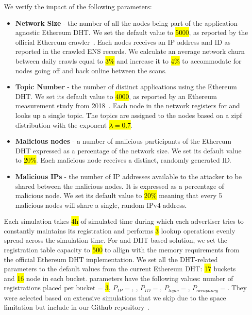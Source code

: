 We verify the impact of the following parameters:
 \begin{itemize}
     \item \textbf{Network Size} - the number of all the nodes being part of the application-agnostic Ethereum DHT. We set the default value to \hl{5000}, as reported by the official Ethereum crawler~\cite{discv4-dns-lists}. Each nodes receives an IP address and ID as reported in the crawled ENS records. We calculate an average network churn between daily crawls equal to \hl{3\%} and increase it to \hl{4\%} to accommodate for nodes going off and back online between the scans. 
     \item \textbf{Topic Number} - the number of distinct applications using the Ethereum DHT. We set its default value to \hl{4000}, as reported by an Ethereum measurement study from 2018~\cite{kim2018measuring}. Each node in the network registers for and looks up a single topic. The topics are assigned to the nodes based on a zipf distribution with the exponent \hl{$\lambda = 0.7$}.
     \item \textbf{Malicious nodes} - a number of malicious participants of the Ethereum DHT expressed as a percentage of the network size. We set its default value to \hl{20\%}. Each malicious node receives a distinct, randomly generated ID. 
     \item \textbf{Malicious IPs} - the number of IP addresses available to the attacker to be shared between the malicious nodes. It is expressed as a percentage of malicious node. We set its default value to \hl{20\%} meaning that every 5 malicious nodes will share a single, random IPv4 address.
 \end{itemize}

Each simulation takes \hl{4h} of simulated time during which each advertiser tries to constantly maintains its registration and performs \hl{3} lookup operations evenly spread across the simulation time. For \sysname and DHT-based solution, we set the registration table capacity to \hl{500} to allign with the memory requirements from the official Ethereum DHT implementation. We set all the DHT-related parameters to the default values from the current Ethereum DHT: \hl{17} buckets and \hl{16} node in each bucket. \sysname parameters have the following values: number of registrations placed per bucket = \hl{3}, $P_{IP} = $, , $P_{ID} = $, $P_{topic} = $, $P_{occupancy} = $. 
They were selected based on extensive simulations that we skip due to the space limitation but include in our Github repository~\cite{our_repo}. 


